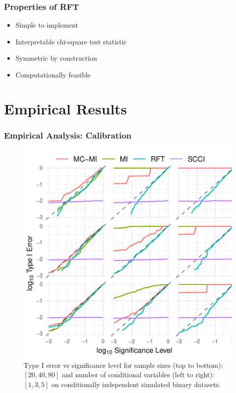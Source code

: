 \documentclass{beamer}
\begin{document}
\begin{frame}
	\frametitle{Properties of RFT}
	\begin{itemize}
		\setlength\itemsep{1em}
		\item Simple to implement
		\item Interpretable chi-square test statistic
		\item Symmetric by construction
		\item Computationally feasible
	\end{itemize}
\end{frame}

\section{Empirical Results}

\begin{frame}
	\frametitle{Empirical Analysis: Calibration}
	\begin{figure}
		\centering
		\includegraphics[scale=0.8]{imgs/calibration_add_vars.pdf}
		\caption*{Type I error vs significance level for sample sizes (top to
		bottom): $ [20, 40, 80] $ and number of conditional variables (left to
		right): $ [1, 3, 5] $ on conditionally independent simulated binary
		datasets.}
	\end{figure}
\end{frame}
\end{document}
